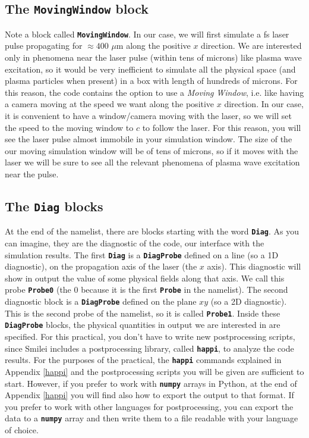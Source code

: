 \documentclass[a4paper,12pt]{extarticle}
\newcommand{\smilei}{{\sc Smilei}\xspace}
\newcommand{\commandline}[1]{\texttt{\textbf{#1}}}
\begin{document}
\subsection*{The \commandline{MovingWindow} block}
Note a block called \commandline{MovingWindow}. In our case, we will first simulate a fs laser pulse  propagating for $\approx 400$ $\mu$m along the positive $x$ direction. We are interested only in phenomena near the laser pulse (within tens of microns) like plasma wave excitation, so it would be very inefficient to simulate all the physical space (and plasma particles when present) in a box with length of hundreds of microns. For this reason, the code contains the option to use a \emph{Moving} \emph{Window}, i.e. like having a camera moving at the speed we want  along the positive $x$ direction. In our case, it is convenient to have a window/camera moving with the laser, so we will set the speed to  the moving window to $c$ to follow the laser. For this reason, you will see the laser pulse almost immobile in your simulation window. The size of the our moving simulation window will be of tens of microns, so if it moves with the laser we will be sure to see all the relevant phenomena of plasma wave excitation near the pulse.

\subsection*{The \commandline{Diag} blocks}
At the end of the namelist, there are blocks starting with the word \commandline{Diag}. As you can imagine, they are the diagnostic of the code, our interface with the simulation results. The first \commandline{Diag} is a \commandline{DiagProbe} defined on a line (so a 1D diagnostic), on the propagation axis of the laser (the $x$ axis). This diagnostic will show in output the value of some physical fields along that axis. We call this probe \commandline{Probe0} (the 0 because it is the first \commandline{Probe} in the namelist). The second diagnostic block is a \commandline{DiagProbe} defined on the plane $xy$ (so a 2D diagnostic). This is the second probe of the namelist, so it is called \commandline{Probe1}. Inside these \commandline{DiagProbe} blocks, the physical quantities in output we are interested in are specified. For this practical, you don't have to write new postprocessing scripts, since \smilei includes a postprocessing library, called \commandline{happi}, to analyze the code results. For the purposes of the practical, the \commandline{happi} commands explained in Appendix \ref{happi} and the postprocessing scripts you will be given are sufficient to start. However, if you prefer to work with \commandline{numpy} arrays in Python, at the end of Appendix \ref{happi} you will find also how to export the output to that format. If you prefer to work with other languages for postprocessing, you can export the data to a \commandline{numpy} array and then write them to a file readable with your language of choice.
\end{document}

